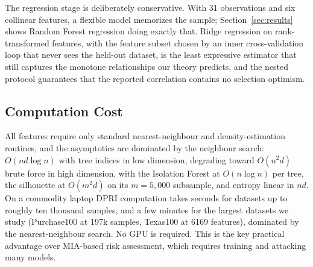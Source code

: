 The regression stage is deliberately conservative. With 31 observations
and six collinear features, a flexible model memorizes the sample;
Section~\ref{sec:results} shows Random Forest regression doing exactly
that. Ridge regression on rank-transformed features, with the feature
subset chosen by an inner cross-validation loop that never sees the
held-out dataset, is the least expressive estimator that still captures
the monotone relationships our theory predicts, and the nested protocol
guarantees that the reported correlation contains no selection
optimism.

\subsection{Computation Cost}

All features require only standard nearest-neighbour and
density-estimation routines, and the asymptotics are dominated by the
neighbour search: $O(nd\log n)$ with tree indices in low dimension,
degrading toward $O(n^2 d)$ brute force in high dimension, with the
Isolation Forest at $O(n\log n)$ per tree, the silhouette at $O(m^2 d)$
on its $m = 5{,}000$ subsample, and entropy linear in $nd$. On a
commodity laptop DPRI computation takes seconds for
datasets up to roughly ten thousand samples, and a few minutes for the
largest datasets we study (Purchase100 at 197k samples, Texas100 at 6169
features), dominated by the nearest-neighbour search.
No GPU is required.
This is the key practical advantage over MIA-based risk assessment, which
requires training and attacking many models.
